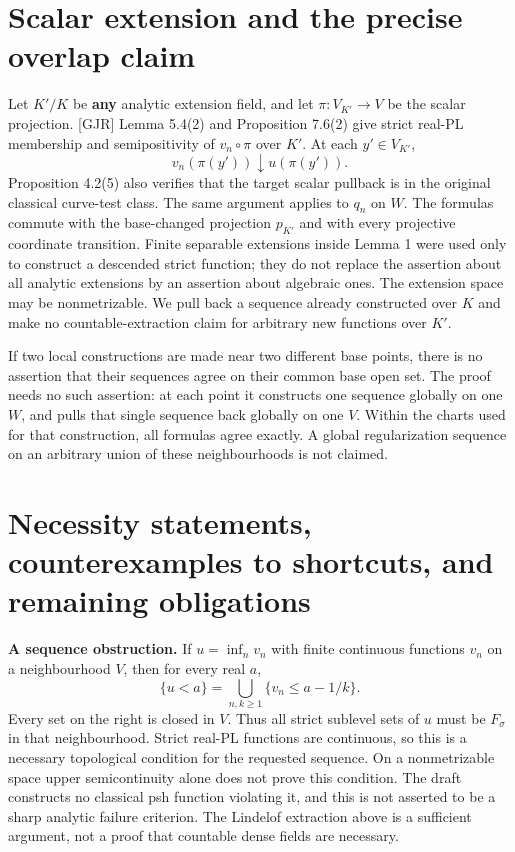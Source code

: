 \documentclass[
  11pt,
]{article}
\begin{document}
\section{Scalar extension and the precise overlap
claim}\label{scalar-extension-and-the-precise-overlap-claim}

Let \(K'/K\) be \textbf{any} analytic extension field, and let
\(\pi:V_{K'}\to V\) be the scalar projection. {[}GJR{]} Lemma 5.4(2) and
Proposition 7.6(2) give strict real-PL membership and semipositivity of
\(v_n\circ\pi\) over \(K'\). At each \(y'\in V_{K'}\),
\[v_n(\pi(y'))\downarrow u(\pi(y')).\] Proposition 4.2(5) also verifies
that the target scalar pullback is in the original classical curve-test
class. The same argument applies to \(q_n\) on \(W\). The formulas
commute with the base-changed projection \(p_{K'}\) and with every
projective coordinate transition. Finite separable extensions inside
Lemma 1 were used only to construct a descended strict function; they do
not replace the assertion about all analytic extensions by an assertion
about algebraic ones. The extension space may be nonmetrizable. We pull
back a sequence already constructed over \(K\) and make no
countable-extraction claim for arbitrary new functions over \(K'\).

If two local constructions are made near two different base points,
there is no assertion that their sequences agree on their common base
open set. The proof needs no such assertion: at each point it constructs
one sequence globally on one \(W\), and pulls that single sequence back
globally on one \(V\). Within the charts used for that construction, all
formulas agree exactly. A global regularization sequence on an arbitrary
union of these neighbourhoods is not claimed.

\section{Necessity statements, counterexamples to shortcuts, and
remaining
obligations}\label{necessity-statements-counterexamples-to-shortcuts-and-remaining-obligations}

\textbf{A sequence obstruction.} If \(u=\inf_n v_n\) with finite
continuous functions \(v_n\) on a neighbourhood \(V\), then for every
real \(a\), \[\{u<a\}=\bigcup_{n,k\ge1}\{v_n\le a-1/k\}.\] Every set on
the right is closed in \(V\). Thus all strict sublevel sets of \(u\)
must be \(F_\sigma\) in that neighbourhood. Strict real-PL functions are
continuous, so this is a necessary topological condition for the
requested sequence. On a nonmetrizable space upper semicontinuity alone
does not prove this condition. The draft constructs no classical psh
function violating it, and this is not asserted to be a sharp analytic
failure criterion. The Lindelof extraction above is a sufficient
argument, not a proof that countable dense fields are necessary.
\end{document}
